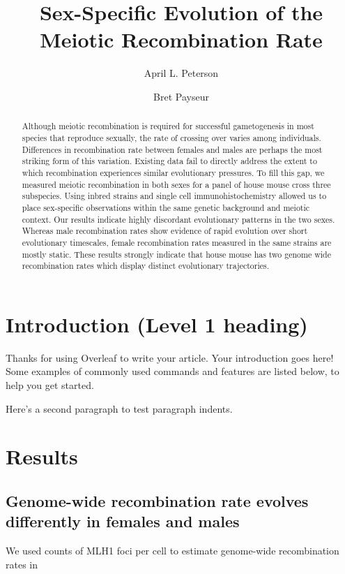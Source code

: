 \documentclass[9pt,lineno]{elife}
\title{Sex-Specific Evolution of the Meiotic Recombination Rate}
\author[1]{April L. Peterson}
\author[1]{Bret Payseur}
\affil[1]{University of Wisconsin-Madison}
\begin{document}
\maketitle

\begin{abstract}
Although meiotic recombination is required for successful gametogenesis in most species that reproduce sexually, the rate of crossing over varies among individuals. Differences in recombination rate between females and males are perhaps the most striking form of this variation. Existing data fail to directly address the extent to which recombination experiences similar evolutionary pressures. To fill this gap, we measured meiotic recombination in both sexes for a panel of house mouse cross three subspecies. Using inbred strains and single cell immunohistochemistry allowed us to place sex-specific observations within the same genetic background and meiotic context. Our results indicate highly discordant evolutionary patterns in the two sexes. Whereas male recombination rates show evidence of rapid evolution over short evolutionary timescales, female recombination rates measured in the same strains are mostly static. These results strongly indicate that house mouse has two genome wide recombination rates which display distinct evolutionary trajectories. 
\end{abstract}


\section{Introduction (Level 1 heading)}

Thanks for using Overleaf to write your article. Your introduction goes here! Some examples of commonly used commands and features are listed below, to help you get started.

Here's a second paragraph to test paragraph indents.

\section{Results}


\subsection{Genome-wide recombination rate evolves differently in females and males} 

We used counts of MLH1 foci per cell to estimate genome-wide recombination rates in 
\end{document}
